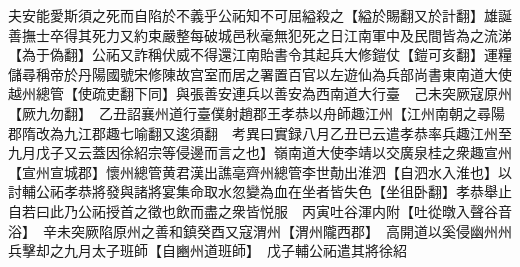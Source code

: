 夫安能愛斯須之死而自陷於不義乎公祏知不可屈縊殺之【縊於賜翻又於計翻】雄誕善撫士卒得其死力又約束嚴整每破城邑秋毫無犯死之日江南軍中及民間皆為之流涕【為于偽翻】公祏又詐稱伏威不得還江南貽書令其起兵大修鎧仗【鎧可亥翻】運糧儲尋稱帝於丹陽國號宋修陳故宫室而居之署置百官以左遊仙為兵部尚書東南道大使越州總管【使疏吏翻下同】與張善安連兵以善安為西南道大行臺　己未突厥寇原州【厥九勿翻】　乙丑詔襄州道行臺僕射趙郡王孝恭以舟師趣江州【江州南朝之尋陽郡隋改為九江郡趣七喻翻又逡須翻　考異曰實録八月乙丑已云遣孝恭率兵趣江州至九月戊子又云蓋因徐紹宗等侵邊而言之也】嶺南道大使李靖以交廣泉桂之衆趣宣州【宣州宣城郡】懷州總管黄君漢出譙亳齊州總管李世勣出淮泗【自泗水入淮也】以討輔公祏孝恭將發與諸將宴集命取水忽變為血在坐者皆失色【坐徂卧翻】孝恭舉止自若曰此乃公祏授首之徵也飲而盡之衆皆悦服　丙寅吐谷渾内附【吐從暾入聲谷音浴】　辛未突厥陷原州之善和鎮癸酉又寇渭州【渭州隴西郡】　高開道以奚侵幽州州兵擊却之九月太子班師【自豳州道班師】　戊子輔公祏遣其將徐紹

